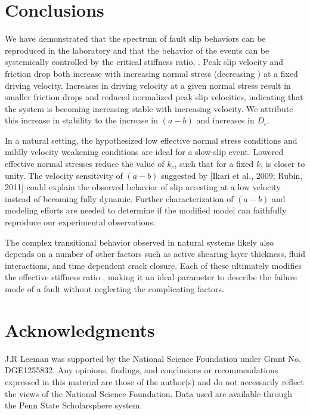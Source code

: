 \section{Conclusions}
We have demonstrated that the spectrum of fault slip behaviors can be reproduced in the laboratory and that the behavior of the events can be systemically controlled by the critical stiffness ratio, . Peak slip velocity and friction drop both increase with increasing normal stress (decreasing ) at a fixed driving velocity. Increases in driving velocity at a given normal stress result in smaller friction drops and reduced normalized peak slip velocities, indicating that the system is becoming increasing stable with increasing velocity. We attribute this increase in stability to the increase in $(a-b)$ and increases in $D_c$. 

In a natural setting, the hypothesized low effective normal stress conditions and mildly velocity weakening conditions are ideal for a slow-slip event. Lowered effective normal stresses reduce the value of $k_c$, such that for a fixed $k$,  is closer to unity. The velocity sensitivity of $(a-b)$ suggested by \cite{}[Ikari et al., 2009; Rubin, 2011] could explain the observed behavior of slip arresting at a low velocity instead of becoming fully dynamic. Further characterization of $(a-b)$ and modeling efforts are needed to determine if the modified model can faithfully reproduce our experimental observations.

The complex transitional behavior observed in natural systems likely also depends on a number of other factors such as active shearing layer thickness, fluid interactions, and time dependent crack closure. Each of these ultimately modifies the effective stiffness ratio , making it an ideal parameter to describe the failure mode of a fault without neglecting the complicating factors.

\section{Acknowledgments}
J.R Leeman was supported by the National Science Foundation under Grant No. DGE1255832. Any opinions, findings, and conclusions or recommendations expressed in this material are those of the author(s) and do not necessarily reflect the views of the National Science Foundation. Data used are available through the Penn State Scholarsphere system.

